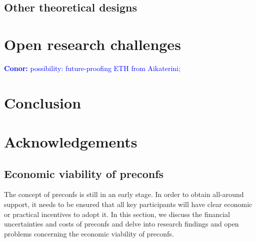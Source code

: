 \documentclass[a4paper]{article}
\theoremstyle{boldstyle}
\newcommand{\cm}[1]{\textcolor{blue}{\textbf{Conor:} #1}}
\begin{document}
        
                

\subsection{Other theoretical designs}

\section{Open research challenges} %
\cm{possibility: future-proofing ETH from Aikaterini;}


\section{Conclusion}

\section*{Acknowledgements}




\newpage

% 


% 

\appendix
\subsection{Economic viability of preconfs} 
    The concept of preconfs is still in an early stage. In order to obtain all-around support, it needs to be ensured that all key participants will have clear economic or practical incentives to adopt it. In this section, we discuss the financial uncertainties and costs of preconfs and delve into research findings and open problems concerning the economic viability of preconfs. 
    
\end{document}
